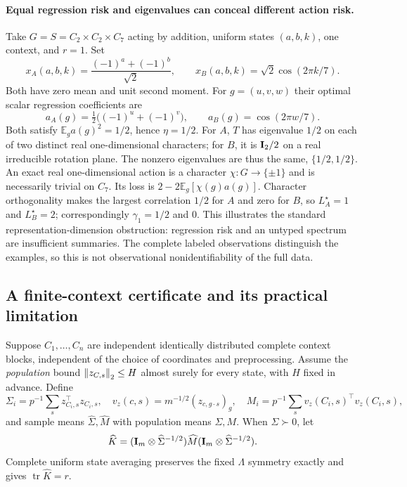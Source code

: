 \paragraph{Equal regression risk and eigenvalues can conceal different action risk.}
\label{sp:counterexample}
Take $G=S=C_2\times C_2\times C_7$ acting by addition, uniform states $(a,b,k)$, one context, and $r=1$. Set
\[
 x_A(a,b,k)=\frac{(-1)^a+(-1)^b}{\sqrt2},\qquad
 x_B(a,b,k)=\sqrt2\cos(2\pi k/7).
\]
Both have zero mean and unit second moment. For $g=(u,v,w)$ their optimal scalar regression coefficients are
\[
 a_A(g)=\tfrac12\big((-1)^u+(-1)^v\big),\qquad
 a_B(g)=\cos(2\pi w/7).
\]
Both satisfy $\mathbb E_g a(g)^2=1/2$, hence $\eta=1/2$. For $A$, $T$ has eigenvalue $1/2$ on each of two distinct real one-dimensional characters; for $B$, it is $\mathbf{I}_2/2$ on a real irreducible rotation plane. The nonzero eigenvalues are thus the same, $\{1/2,1/2\}$. An exact real one-dimensional action is a character $\chi:G\to\{\pm1\}$ and is necessarily trivial on $C_7$. Its loss is $2-2\mathbb E_g[\chi(g)a(g)]$. Character orthogonality makes the largest correlation $1/2$ for $A$ and zero for $B$, so $L_A^\star=1$ and $L_B^\star=2$; correspondingly $\gamma_1=1/2$ and $0$. This illustrates the standard representation-dimension obstruction: regression risk and an untyped spectrum are insufficient summaries. The complete labeled observations distinguish the examples, so this is not observational nonidentifiability of the full data.

\subsection{A finite-context certificate and its practical limitation}
\label{sp:certificate}
Suppose $C_1,\ldots,C_n$ are independent identically distributed complete context blocks, independent of the choice of coordinates and preprocessing. Assume the \emph{population} bound $\left\lVert z_{C,s}\right\rVert_2\le H$ almost surely for every state, with $H$ fixed in advance. Define
\[
 \Sigma_i=p^{-1}\sum_sz_{C_i,s}^\top z_{C_i,s},\quad
 v_z(c,s)=m^{-1/2}(z_{c,g\cdot s})_g,\quad
 M_i=p^{-1}\sum_sv_z(C_i,s)^\top v_z(C_i,s),
\]
and sample means $\widehat\Sigma,\widehat M$ with population means $\Sigma,M$. When $\widehat\Sigma\succ0$, let
\[
 \widehat K=(\mathbf{I}_m\otimes\widehat\Sigma^{-1/2})\widehat M
                    (\mathbf{I}_m\otimes\widehat\Sigma^{-1/2}).
\]
Complete uniform state averaging preserves the fixed $\Lambda$ symmetry exactly and gives $\operatorname{tr}\widehat K=r$.


